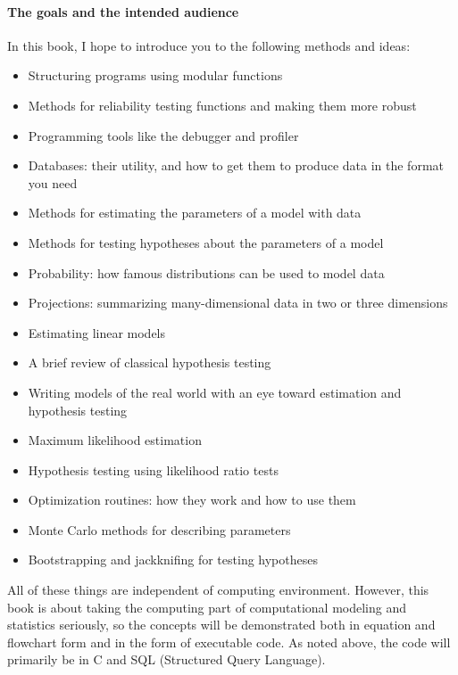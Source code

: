 \begin{multicols}{2}

\paragraph{The goals and the intended audience}

In this book, I hope to introduce you to the following methods and
ideas:
\begin{itemize}
\itemsep 0pt
\item Structuring programs using modular functions
\item Methods for reliability testing functions and making them more robust
\item Programming tools like the debugger and profiler
\item Databases: their utility, and how to get them to produce data in
the format you need
\item Methods for estimating the parameters of a model with data
\item Methods for testing hypotheses about the parameters of a model
\item Probability: how famous distributions can be used to model data
\item Projections: summarizing many-dimensional data in two or three
dimensions
\item Estimating linear models
\item A brief review of classical hypothesis testing 
\item Writing models of the real world with an eye toward estimation and
hypothesis testing
\item Maximum likelihood estimation
\item Hypothesis testing using likelihood ratio tests
\item Optimization routines: how they work and how to use them
\item Monte Carlo methods for describing parameters
\item Bootstrapping and jackknifing for testing hypotheses
\end{itemize}

All of these things are independent of computing environment. However,
this book is about taking the computing part of computational modeling
and statistics seriously, so the concepts will be demonstrated both in
equation and flowchart form and in the form of executable code. As
noted above, the code will primarily be in C and SQL (Structured Query Language).


\end{multicols}
